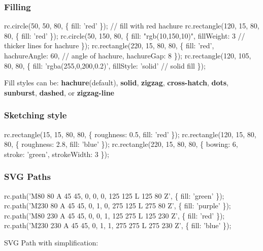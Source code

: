 \subsubsection*{Filling}




\begin{DoxyCode}
rc.circle(50, 50, 80, \{ fill: 'red' \}); // fill with red hachure
rc.rectangle(120, 15, 80, 80, \{ fill: 'red' \});
rc.circle(50, 150, 80, \{
  fill: "rgb(10,150,10)",
  fillWeight: 3 // thicker lines for hachure
\});
rc.rectangle(220, 15, 80, 80, \{
  fill: 'red',
  hachureAngle: 60, // angle of hachure,
  hachureGap: 8
\});
rc.rectangle(120, 105, 80, 80, \{
  fill: 'rgba(255,0,200,0.2)',
  fillStyle: 'solid' // solid fill
\});
\end{DoxyCode}


Fill styles can be\+: {\bfseries hachure}(default), {\bfseries solid}, {\bfseries zigzag}, {\bfseries cross-\/hatch}, {\bfseries dots}, {\bfseries sunburst}, {\bfseries dashed}, or {\bfseries zigzag-\/line}



\subsubsection*{Sketching style}




\begin{DoxyCode}
rc.rectangle(15, 15, 80, 80, \{ roughness: 0.5, fill: 'red' \});
rc.rectangle(120, 15, 80, 80, \{ roughness: 2.8, fill: 'blue' \});
rc.rectangle(220, 15, 80, 80, \{ bowing: 6, stroke: 'green', strokeWidth: 3 \});
\end{DoxyCode}


\subsubsection*{S\+VG Paths}




\begin{DoxyCode}
rc.path('M80 80 A 45 45, 0, 0, 0, 125 125 L 125 80 Z', \{ fill: 'green' \});
rc.path('M230 80 A 45 45, 0, 1, 0, 275 125 L 275 80 Z', \{ fill: 'purple' \});
rc.path('M80 230 A 45 45, 0, 0, 1, 125 275 L 125 230 Z', \{ fill: 'red' \});
rc.path('M230 230 A 45 45, 0, 1, 1, 275 275 L 275 230 Z', \{ fill: 'blue' \});
\end{DoxyCode}


S\+VG Path with simplification\+:


